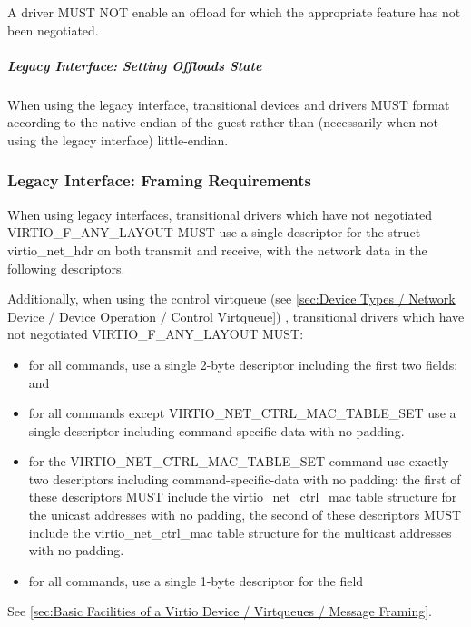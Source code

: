 A driver MUST NOT enable an offload for which the appropriate feature
has not been negotiated.

\subparagraph{Legacy Interface: Setting Offloads State}\label{sec:Device Types / Network Device / Device Operation / Control Virtqueue / Offloads State Configuration / Setting Offloads State / Legacy Interface: Setting Offloads State}
When using the legacy interface, transitional devices and drivers
MUST format 
according to the native endian of the guest rather than
(necessarily when not using the legacy interface) little-endian.


\subsubsection{Legacy Interface: Framing Requirements}\label{sec:Device
Types / Network Device / Legacy Interface: Framing Requirements}

When using legacy interfaces, transitional drivers which have not
negotiated VIRTIO_F_ANY_LAYOUT MUST use a single descriptor for the
struct virtio_net_hdr on both transmit and receive, with the
network data in the following descriptors.

Additionally, when using the control virtqueue (see \ref{sec:Device
Types / Network Device / Device Operation / Control Virtqueue})
, transitional drivers which have not
negotiated VIRTIO_F_ANY_LAYOUT MUST:
\begin{itemize}
\item for all commands, use a single 2-byte descriptor including the first two
fields:  and 
\item for all commands except VIRTIO_NET_CTRL_MAC_TABLE_SET
use a single descriptor including command-specific-data
with no padding.
\item for the VIRTIO_NET_CTRL_MAC_TABLE_SET command use exactly
two descriptors including command-specific-data with no padding:
the first of these descriptors MUST include the
virtio_net_ctrl_mac table structure for the unicast addresses with no padding,
the second of these descriptors MUST include the
virtio_net_ctrl_mac table structure for the multicast addresses
with no padding.
\item for all commands, use a single 1-byte descriptor for the
 field
\end{itemize}

See \ref{sec:Basic
Facilities of a Virtio Device / Virtqueues / Message Framing}.

